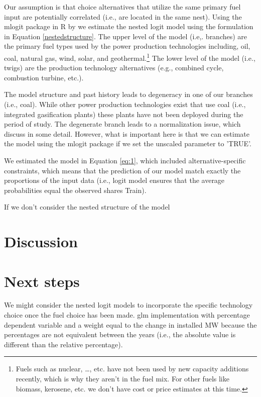 \documentclass[10pt]{amsart}
\begin{document}
Our assumption is that choice alternatives that utilize the same primary fuel input are potentially correlated (i.e., are located in the same nest). 
Using the mlogit package in R by \cite{mlogit2013} we estimate the nested logit model using the formulation in Equation \ref{nestedstructure}. 
The upper level of the model (i.e,. branches) are the primary fuel types used by the power production technologies including, oil, coal, natural gas, wind, solar, and geothermal.\footnote{Fuels such as nuclear, \ldots, etc. have not been used by new capacity additions recently, which is why they aren't in the fuel mix. For other fuels like biomass, kerosene, etc. we don't have cost or price estimates at this time.}
The lower level of the model (i.e., twigs) are the production technology alternatives (e.g., combined cycle, combustion turbine, etc.). 

The model structure and past history leads to degeneracy in one of our branches (i.e., coal). 
While other power production technologies exist that use coal (i.e., integrated gasification plants) these plants have not been deployed during the period of study.
The degenerate branch leads to a normalization issue, which \cite{hensher2002specification} discuss in some detail.
However, what is important here is that we can estimate the model using the mlogit package if we set the unscaled parameter to 'TRUE'. 

We estimated the model in Equation \ref{eq:1}, which included alternative-specific constraints, which means that the prediction of our model match exactly the proportions of the input data (i.e., logit model ensures that the average probabilities equal the observed shares \cite{} Train).
 
 
If we don't consider the nested structure of the model 

\section{Discussion}


\section{Next steps}
We might consider the nested logit models to incorporate the specific technology choice once the fuel choice has been made. 
glm implementation with percentage dependent variable and a weight equal to the change in installed MW because the percentages are not equivalent between the years (i.e., the absolute value is different than the relative percentage). 
\end{document}
